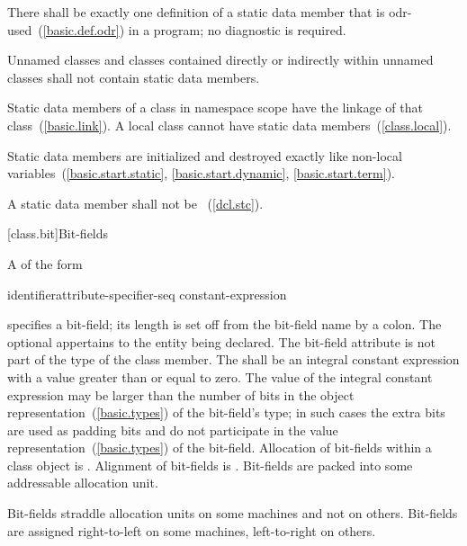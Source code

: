 \pnum
\begin{note}
There shall be exactly one definition of a static data member
that is odr-used~(\ref{basic.def.odr}) in a program; no diagnostic is required.
\end{note}
Unnamed classes and classes contained directly
or indirectly within unnamed classes shall not contain static
data members.

\pnum
\begin{note}
Static data members of a class in namespace scope have the linkage of that class~(\ref{basic.link}). A local class cannot have static data members~(\ref{class.local}).
\end{note}

\pnum
Static data members are initialized and destroyed exactly like
non-local variables~(\ref{basic.start.static}, \ref{basic.start.dynamic},
\ref{basic.start.term}).

\pnum
A static data member shall not be
~(\ref{dcl.stc}).

[class.bit]{Bit-fields}%

\pnum
A  of the form

\begin{ncbnftab}
identifier\opt  attribute-specifier-seq\opt{} \terminal{:} constant-expression
\end{ncbnftab}

%
%
specifies a bit-field;
its length is set off from the bit-field name by a colon. The optional  appertains to the entity being declared. The bit-field
attribute is not part of the type of the class member. The
 shall be an integral constant expression
with a value greater than or equal to zero. The
value of the integral constant expression may
be larger than the number of bits in the object
representation~(\ref{basic.types}) of the bit-field's type; in such
cases the extra bits are used as padding bits and do not participate in
the value representation~(\ref{basic.types}) of the bit-field.
%
Allocation of bit-fields within a class object is
.
%
Alignment of bit-fields is .
%
Bit-fields are packed into some addressable allocation unit.
\begin{note}
Bit-fields straddle allocation units on some machines and not on others.
Bit-fields are assigned right-to-left on some machines, left-to-right on
others.
\end{note}

